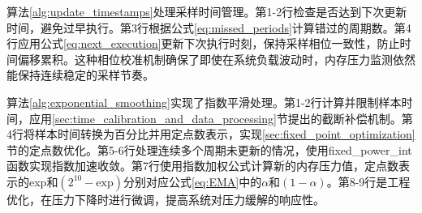 算法\ref{alg:update_timestamps}处理采样时间管理。第1-2行检查是否达到下次更新时间，避免过早执行。第3行根据公式\ref{eq:missed_periods}计算错过的周期数。第4行应用公式\ref{eq:next_execution}更新下次执行时刻，保持采样相位一致性，防止时间偏移累积。这种相位校准机制确保了即使在系统负载波动时，内存压力监测依然能保持连续稳定的采样节奏。

算法\ref{alg:exponential_smoothing}实现了指数平滑处理。第1-2行计算并限制样本时间，应用\ref{sec:time_calibration_and_data_processing}节提出的截断补偿机制。第4行将样本时间转换为百分比并用定点数表示，实现\ref{sec:fixed_point_optimization}节的定点数优化。第5-6行处理连续多个周期未更新的情况，使用fixed\_power\_int函数实现指数加速收敛。第7行使用指数加权公式计算新的内存压力值，定点数表示的exp和$(2^{10}-\text{exp})$分别对应公式\ref{eq:EMA}中的\(\alpha\)和\((1-\alpha)\)。第8-9行是工程优化，在压力下降时进行微调，提高系统对压力缓解的响应性。

